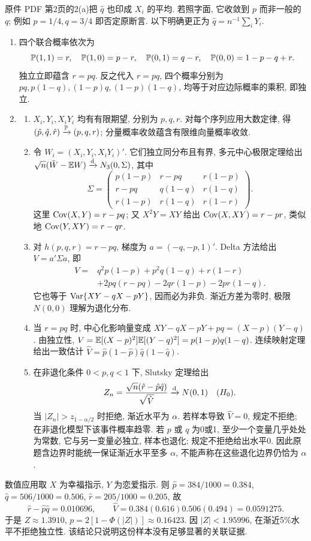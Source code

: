\begin{solution}
原件 PDF 第2页的2(a)把 $\hat q$ 也印成 $X_i$ 的平均. 若照字面, 它收敛到 $p$ 而非一般的 $q$; 例如 $p=1/4,q=3/4$ 即否定原断言. 以下明确更正为 $\hat q=n^{-1}\sum_iY_i$.
\begin{enumerate}[label=\arabic*.]
\item 四个联合概率依次为
\[
\mathbb P(1,1)=r,\quad\mathbb P(1,0)=p-r,\quad\mathbb P(0,1)=q-r,\quad\mathbb P(0,0)=1-p-q+r.
\]
独立立即蕴含 $r=pq$. 反之代入 $r=pq$, 四个概率分别为 $pq,p(1-q),(1-p)q,(1-p)(1-q)$, 均等于对应边际概率的乘积, 即独立.
\item
\begin{enumerate}[label=\alph*)]
\item $X_i,Y_i,X_iY_i$ 均有有限期望, 分别为 $p,q,r$. 对每个序列应用大数定律, 得 $(\hat p,\hat q,\hat r)\xrightarrow{\mathbb P}(p,q,r)$; 分量概率收敛蕴含有限维向量概率收敛.
\item 令 $W_i=(X_i,Y_i,X_iY_i)'$. 它们独立同分布且有界, 多元中心极限定理给出 $\sqrt n(\bar W-\mathbb E W)\xrightarrow{\mathrm d} N_3(0,\Sigma)$, 其中
\[
\Sigma=\begin{pmatrix}
p(1-p)&r-pq&r(1-p)\\
r-pq&q(1-q)&r(1-q)\\
r(1-p)&r(1-q)&r(1-r)
\end{pmatrix}.
\]
这里 $\operatorname{Cov}(X,Y)=r-pq$; 又 $X^2Y=XY$ 给出 $\operatorname{Cov}(X,XY)=r-pr$, 类似地 $\operatorname{Cov}(Y,XY)=r-qr$.
\item 对 $h(p,q,r)=r-pq$, 梯度为 $a=(-q,-p,1)'$. Delta 方法给出 $V=a'\Sigma a$, 即
\begin{align*}
V={}&q^2p(1-p)+p^2q(1-q)+r(1-r)\\
 &+2pq(r-pq)-2qr(1-p)-2pr(1-q).
\end{align*}
它也等于 $\operatorname{Var}\{XY-qX-pY\}$, 因而必为非负. 渐近方差为零时, 极限 $N(0,0)$ 理解为退化分布.
\item 当 $r=pq$ 时, 中心化影响量变成
$XY-qX-pY+pq=(X-p)(Y-q)$. 由独立性,
$V=\mathbb E[(X-p)^2]\mathbb E[(Y-q)^2]=p(1-p)q(1-q)$.
连续映射定理给出一致估计
$\hat V=\hat p(1-\hat p)\hat q(1-\hat q)$.
\item 在非退化条件 $0<p,q<1$ 下, Slutsky 定理给出
\[
Z_n=\frac{\sqrt n(\hat r-\hat p\hat q)}{\sqrt{\hat V}}\xrightarrow{\mathrm d} N(0,1)
\quad(H_0).
\]
当 $|Z_n|>z_{1-\alpha/2}$ 时拒绝, 渐近水平为 $\alpha$. 若样本导致 $\hat V=0$, 规定不拒绝; 在非退化模型下该事件概率趋零. 若 $p$ 或 $q$ 为0或1, 至少一个变量几乎处处为常数, 它与另一变量必独立, 样本也退化; 规定不拒绝给出水平0. 因此原题含边界时能统一保证渐近水平至多 $\alpha$, 不能声称在这些退化边界仍恰为 $\alpha$.
\end{enumerate}
\end{enumerate}
数值应用取 $X$ 为幸福指示, $Y$ 为恋爱指示. 则 $\hat p=384/1000=0.384$, $\hat q=506/1000=0.506$, $\hat r=205/1000=0.205$, 故
\[
\hat r-\hat p\hat q=0.010696,\qquad
\hat V=0.384(0.616)0.506(0.494)=0.0591275.
\]
于是 $Z\approx1.3910$, $p=2[1-\Phi(|Z|)]\approx0.16423$. 因 $|Z|<1.95996$, 在渐近5\%水平不拒绝独立性. 该结论只说明这份样本没有足够显著的关联证据.
\end{solution}
